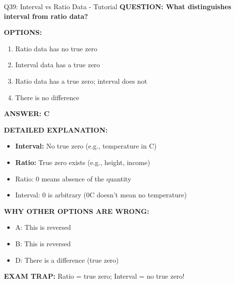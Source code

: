\documentclass[8pt]{beamer}
\begin{document}
	\begin{frame}{Q39: Interval vs Ratio Data - Tutorial}
		\fontsize{6.5}{7.5}\selectfont
		\textbf{QUESTION: What distinguishes interval from ratio data?}
		
		\vspace{0.1cm}
		\textbf{OPTIONS:}
		\begin{enumerate}
			\item Ratio data has no true zero
			\item Interval data has a true zero
			\item Ratio data has a true zero; interval does not
			\item There is no difference
		\end{enumerate}
		
		\vspace{0.1cm}
		\textcolor{myblue}{\textbf{ANSWER: C}}
		
		\vspace{0.1cm}
		\textbf{DETAILED EXPLANATION:}
		\begin{itemize}
			\item \textbf{Interval:} No true zero (e.g., temperature in \textdegree C)
			\item \textbf{Ratio:} True zero exists (e.g., height, income)
			\item Ratio: 0 means absence of the quantity
			\item Interval: 0 is arbitrary (0\textdegree C doesn't mean no temperature)
		\end{itemize}
		
		\vspace{0.1cm}
		\textcolor{myred}{\textbf{WHY OTHER OPTIONS ARE WRONG:}}
		\begin{itemize}
			\item \textcolor{myred}{A:} This is reversed
			\item \textcolor{myred}{B:} This is reversed
			\item \textcolor{myred}{D:} There is a difference (true zero)
		\end{itemize}
		
		\textcolor{myred}{\textbf{EXAM TRAP:}} Ratio = \textcolor{myblue}{true zero}; Interval = \textcolor{myblue}{no true zero}!
	\end{frame}
	
\end{document}
